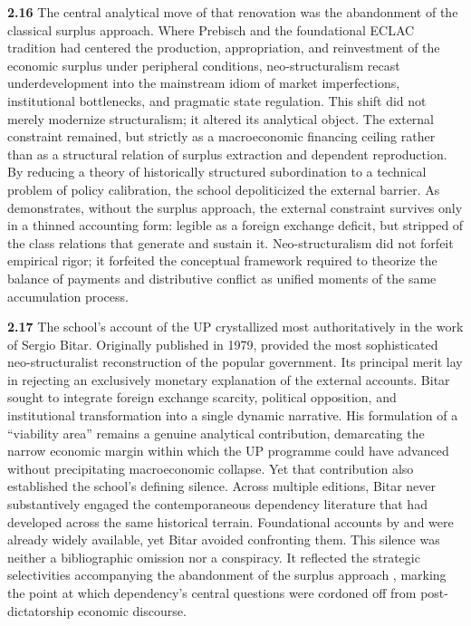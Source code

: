 \textbf{2.16} The central analytical move of that renovation was the abandonment of the classical 
surplus approach. Where Prebisch and the foundational ECLAC tradition had centered the production, 
appropriation, and reinvestment of the economic surplus under peripheral conditions, neo-structuralism 
recast underdevelopment into the mainstream idiom of market imperfections, institutional bottlenecks, 
and pragmatic state regulation. This shift did not merely modernize structuralism; it altered its 
analytical object. The external constraint remained, but strictly as a macroeconomic financing ceiling 
rather than as a structural relation of surplus extraction and dependent reproduction. By reducing a 
theory of historically structured subordination to a technical problem of policy calibration, the 
school depoliticized the external barrier. As \citet{Leiva2008} demonstrates, without the surplus 
approach, the external constraint survives only in a thinned accounting form: legible as a foreign 
exchange deficit, but stripped of the class relations that generate and sustain it. Neo-structuralism 
did not forfeit empirical rigor; it forfeited the conceptual framework required to theorize the 
balance of payments and distributive conflict as unified moments of the same accumulation process.

\textbf{2.17} The school's account of the UP crystallized most authoritatively in the work of Sergio Bitar. 
Originally published in 1979, \citet{Bitar2013} provided the most sophisticated neo-structuralist 
reconstruction of the popular government. Its principal merit lay in rejecting an exclusively monetary 
explanation of the external accounts. Bitar sought to integrate foreign exchange scarcity, political 
opposition, and institutional transformation into a single dynamic narrative. His formulation of a 
``viability area'' remains a genuine analytical contribution, demarcating the narrow economic margin 
within which the UP programme could have advanced without precipitating macroeconomic collapse. Yet 
that contribution also established the school's defining silence. Across multiple editions, Bitar never 
substantively engaged the contemporaneous dependency literature that had developed across the same 
historical terrain. Foundational accounts by \citet{DeVylder1976} and \citet{Stallings1978} were already 
widely available, yet Bitar avoided confronting them. This silence was neither a bibliographic omission 
nor a conspiracy. It reflected the strategic selectivities accompanying the abandonment of the surplus 
approach \citep{Leiva2008}, marking the point at which dependency's central questions were cordoned 
off from post-dictatorship economic discourse.

